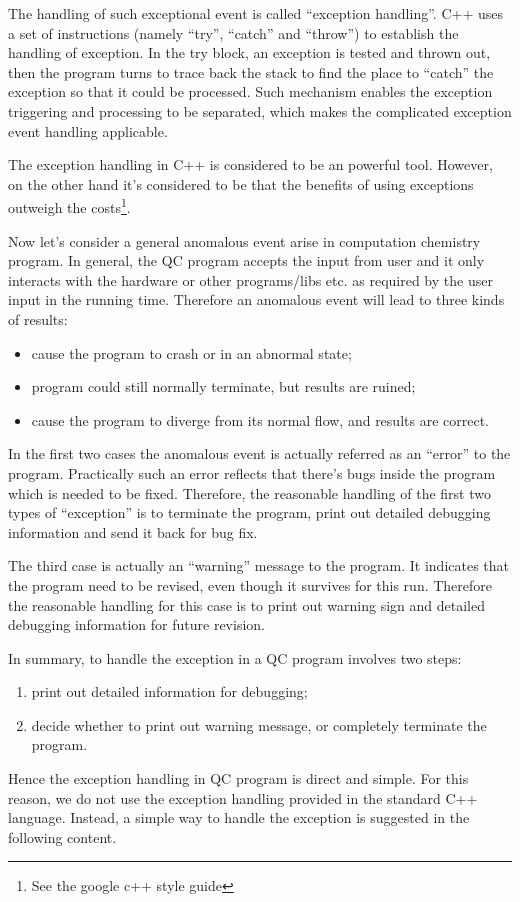 The handling of such exceptional event is called ``exception handling''. C++
uses a set of instructions (namely ``try'', ``catch'' and ``throw'') to establish
the handling of exception. In the try block, an exception is tested and thrown
out, then the program turns to trace back the stack to find the place to ``catch''
the exception so that it could be processed. Such mechanism enables the exception 
triggering and processing to be separated, which makes the complicated exception 
event handling applicable.

The exception handling in C++ is considered to be an powerful tool. However, 
on the other hand it's considered to be that the benefits of using exceptions 
outweigh the costs\footnote{See the google c++ style guide}.

Now let's consider a general anomalous event arise in computation chemistry 
program. In general, the QC program accepts the input from user and it only 
interacts with the hardware or other programs/libs etc. as required by the user input
in the running time. Therefore an anomalous event will lead to three kinds 
of results:
\begin{itemize}
 \item cause the program to crash or in an abnormal state;
 \item program could still normally terminate, but results are ruined;
 \item cause the program to diverge from its normal flow, and results are correct.
\end{itemize}

In the first two cases the anomalous event is actually referred as an ``error''
to the program. Practically such an error reflects that there's bugs inside the 
program which is needed to be fixed. Therefore, the reasonable handling of 
the first two types of ``exception'' is to terminate the program, print out detailed
debugging information and send it back for bug fix.

The third case is actually an ``warning'' message to the program. It indicates
that the program need to be revised, even though it survives for this run. Therefore
the reasonable handling for this case is to print out warning sign and detailed 
debugging information for future revision.

In summary, to handle the exception in a QC program involves two steps:
\begin{enumerate}
 \item print out detailed information for debugging;
 \item decide whether to print out warning message, or completely terminate the program.
\end{enumerate}
Hence the exception handling in QC program is direct and simple. For this reason,
we do not use the exception handling provided in the standard C++ language. Instead,
a simple way to handle the exception is suggested in the following content.

